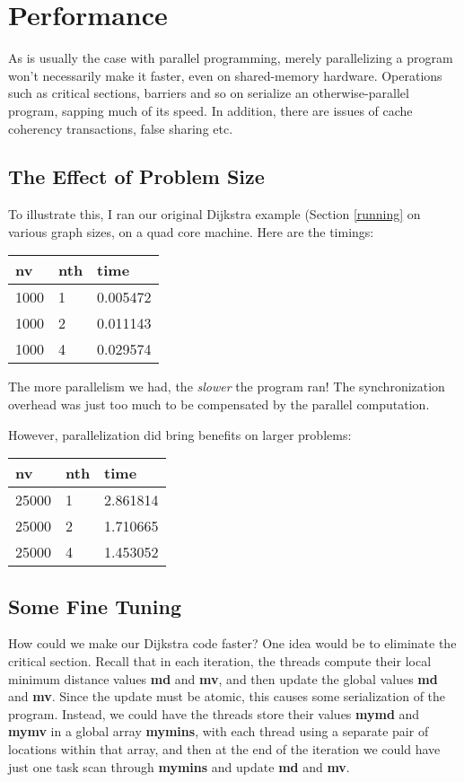 \section{Performance}

As is usually the case with parallel programming, merely parallelizing a
program won't necessarily make it faster, even on shared-memory
hardware.  Operations such as critical sections, barriers and so on
serialize an otherwise-parallel program, sapping much of its speed.
In addition, there are issues of cache coherency transactions, false
sharing etc.

\subsection{The Effect of Problem Size}

To illustrate this, I ran our original Dijkstra example (Section
\ref{running} on various graph sizes, on a quad core machine.  Here are
the timings:

\begin{tabular}{|l|l|l|}
\hline
nv & nth & time \\ \hline
\hline
1000 & 1 & 0.005472 \\ \hline
1000 & 2 & 0.011143 \\ \hline
1000 & 4 & 0.029574 \\ \hline
\end{tabular}

The more parallelism we had, the {\it slower} the program ran!  The
synchronization overhead was just too much to be compensated by the
parallel computation.

However, parallelization did bring benefits on larger problems:

\begin{tabular}{|l|l|l|}
\hline
nv & nth & time \\ \hline
\hline
25000 & 1 & 2.861814 \\ \hline
25000 & 2 & 1.710665 \\ \hline
25000 & 4 & 1.453052 \\ \hline
\end{tabular}

\subsection{Some Fine Tuning}

How could we make our Dijkstra code faster?  One idea would be to
eliminate the critical section.  Recall that in each iteration, the
threads compute their local minimum distance values {\bf md} and {\bf
mv}, and then update the global values {\bf md} and {\bf mv}.  Since the
update must be atomic, this causes some serialization of the program.
Instead, we could have the threads store their values {\bf mymd} and
{\bf mymv} in a global array {\bf mymins}, with each thread using a
separate pair of locations within that array, and then at the end of the
iteration we could have just one task scan through {\bf mymins} and
update {\bf md} and {\bf mv}.


